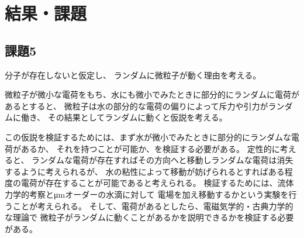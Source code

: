 \documentclass[../../../main]{subfiles}
\begin{document}
\section{結果・課題}


\clearpage

\clearpage

\clearpage

\clearpage

\subsection{課題5}
分子が存在しないと仮定し、
ランダムに微粒子が動く理由を考える。

微粒子が微小な電荷をもち、水にも微小でみたときに部分的にランダムに電荷があるとすると、
微粒子は水の部分的な電荷の偏りによって斥力や引力がランダムに働き、
その結果としてランダムに動くと仮説を考える。

この仮説を検証するためには、まず水が微小でみたときに部分的にランダムな電荷があるか、
それを持つことが可能か、を検証する必要がある。
定性的に考えると、
ランダムな電荷が存在すればその方向へと移動しランダムな電荷は消失するように考えられるが、
水の粘性によって移動が妨げられるとすればある程度の電荷が存在することが可能であると考えられる。
検証するためには、流体力学的考察と\si{\micro\meter}オーダーの水滴に対して
電場を加え移動するかという実験を行うことが考えられる。
そして、電荷があるとしたら、電磁気学的・古典力学的な理論で
微粒子がランダムに動くことがあるかを説明できるかを検証する必要がある。


\clearpage

\clearpage

\clearpage

\end{document}
